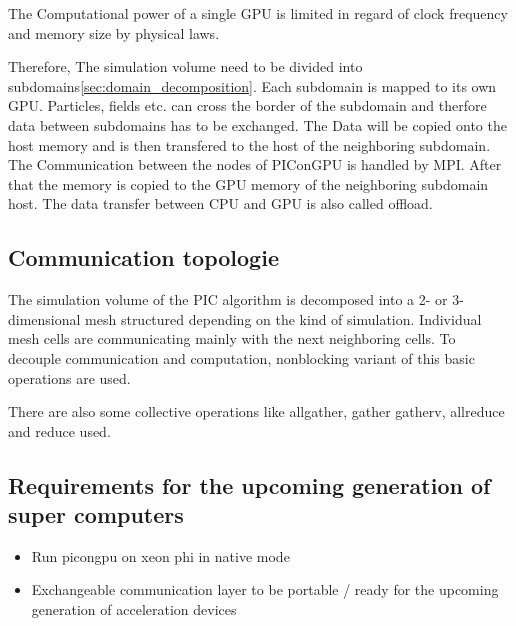 The Computational power of a single GPU is limited in regard of clock
frequency and memory size by physical laws.

Therefore, The simulation volume need to be divided into
subdomains\ref{sec:domain_decomposition}. Each subdomain is mapped to
its own GPU. Particles, fields etc. can cross the border of the
subdomain and therfore data between subdomains has to be
exchanged. The Data will be copied onto the host memory and is then
transfered to the host of the neighboring subdomain. The Communication
between the nodes of PIConGPU is handled by MPI.  After that the
memory is copied to the GPU memory of the neighboring subdomain
host. The data transfer between CPU and GPU is also called offload.



\subsection{Communication topologie}
The simulation volume of the PIC algorithm is decomposed into a 2- or
3- dimensional mesh structured depending on the kind of simulation.
Individual mesh cells are communicating mainly with the next
neighboring cells. To decouple communication and computation,
nonblocking variant of this basic operations are used.

 There are also some
collective operations like allgather, gather gatherv, allreduce and
reduce used.

\subsection{Requirements for the upcoming generation of super computers}
\begin{itemize}
\item Run picongpu on xeon phi in native mode
\item Exchangeable communication layer to be portable / ready for the
  upcoming generation of acceleration devices
\end{itemize}

